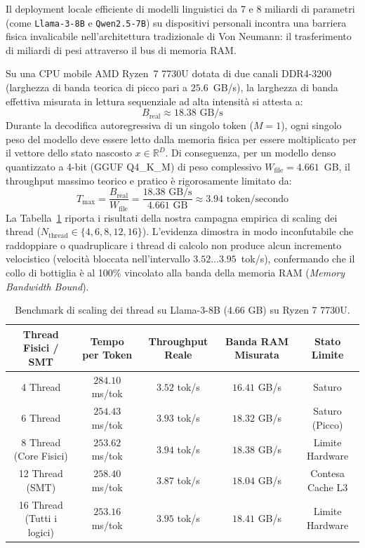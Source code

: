 \documentclass[10pt,a4paper]{article}
\theoremstyle{definition}
\begin{document}
Il deployment locale efficiente di modelli linguistici da 7 e 8 miliardi di parametri (come \texttt{Llama-3-8B} e \texttt{Qwen2.5-7B}) su dispositivi personali incontra una barriera fisica invalicabile nell'architettura tradizionale di Von Neumann: il trasferimento di miliardi di pesi attraverso il bus di memoria RAM.

Su una CPU mobile AMD Ryzen~7 7730U dotata di due canali DDR4-3200 (larghezza di banda teorica di picco pari a $25.6$~GB/s), la larghezza di banda effettiva misurata in lettura sequenziale ad alta intensità si attesta a:
\begin{equation}
B_{\text{real}} \approx 18.38 \text{ GB/s}
\end{equation}
Durante la decodifica autoregressiva di un singolo token ($M=1$), ogni singolo peso del modello deve essere letto dalla memoria fisica per essere moltiplicato per il vettore dello stato nascosto $x \in \mathbb{R}^D$. Di conseguenza, per un modello denso quantizzato a 4-bit (GGUF Q4\_K\_M) di peso complessivo $W_{\text{file}} = 4.661$~GB, il throughput massimo teorico e pratico è rigorosamente limitato da:
\begin{equation}
T_{\text{max}} = \frac{B_{\text{real}}}{W_{\text{file}}} = \frac{18.38 \text{ GB/s}}{4.661 \text{ GB}} \approx 3.94 \text{ token/secondo}
\end{equation}
La Tabella~\ref{tab:thread_scaling} riporta i risultati della nostra campagna empirica di scaling dei thread ($N_{\text{thread}} \in \{4, 6, 8, 12, 16\}$). L'evidenza dimostra in modo inconfutabile che raddoppiare o quadruplicare i thread di calcolo non produce alcun incremento velocistico (velocità bloccata nell'intervallo $3.52 \dots 3.95$~tok/s), confermando che il collo di bottiglia è al 100\% vincolato alla banda della memoria RAM (\textit{Memory Bandwidth Bound}).

\begin{table}[htbp]
\centering
\small
\caption{Benchmark di scaling dei thread su Llama-3-8B (4.66 GB) su Ryzen 7 7730U.}
\label{tab:thread_scaling}
\begin{tabular}{ccccc}
\toprule
\textbf{Thread Fisici / SMT} & \textbf{Tempo per Token} & \textbf{Throughput Reale} & \textbf{Banda RAM Misurata} & \textbf{Stato Limite} \\
\midrule
4 Thread & $284.10$ ms/tok & $3.52$ tok/s & $16.41$ GB/s & Saturo \\
6 Thread & $254.43$ ms/tok & $3.93$ tok/s & $18.32$ GB/s & Saturo (Picco) \\
8 Thread (Core Fisici) & $253.62$ ms/tok & $3.94$ tok/s & $18.38$ GB/s & Limite Hardware \\
12 Thread (SMT) & $258.40$ ms/tok & $3.87$ tok/s & $18.04$ GB/s & Contesa Cache L3 \\
16 Thread (Tutti i logici) & $253.16$ ms/tok & $3.95$ tok/s & $18.41$ GB/s & Limite Hardware \\
\bottomrule
\end{tabular}
\end{table}
\end{document}
